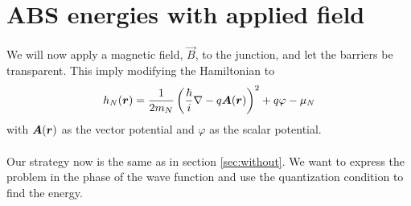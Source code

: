 \section{ABS energies with applied field}
\label{sec:withB}
We will now apply a magnetic field, $\vec{B}$, to the junction, and let the barriers be transparent. This imply modifying the Hamiltonian to 
\begin{equation}
    h_N(\boldsymbol{r}) = \frac{1}{2m_N}\left(\frac{\hbar}{i}\nabla-q\boldsymbol{A}(\boldsymbol{r})\right)^2+q\varphi-\mu_N    
\end{equation}
with $\boldsymbol{A}(\boldsymbol{r})$ as the vector potential and $\varphi$ as the scalar potential. 
\\
\\
Our strategy now is the same as in section \ref{sec:without}. We want to express the problem in the phase of the wave function and use the quantization condition to find the energy.

